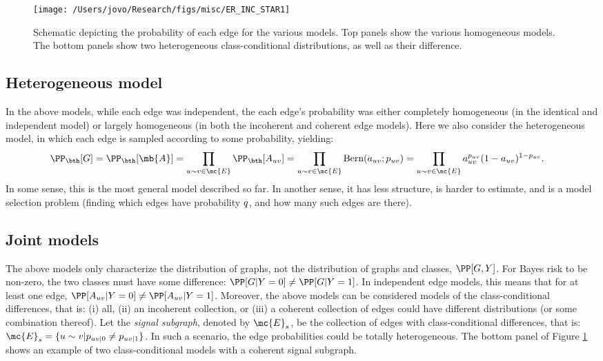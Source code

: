 \begin{figure}[h!]
\centering \texttt{[image: /Users/jovo/Research/figs/misc/ER\_INC\_STAR1]}
\caption{Schematic depicting the probability of each edge for the various models. Top panels show the various homogeneous models.  The bottom panels show two heterogeneous class-conditional distributions, as well as their difference.}
\label{fig:models}
\end{figure}


\subsection{Heterogeneous model} %
\label{sub:heterogeneous_model}

In the above models, while each edge was independent, the each edge's probability was either completely homogeneous (in the identical and independent model) or largely homogeneous (in both the incoherent and coherent edge models).  Here we also consider the heterogeneous model, in which each edge is sampled according to some probability, yielding:
\begin{align}
		\PP_{\bth}[G]&=\PP_{\bth}[\mb{A}]=\prod_{u \sim v \in \mc{E}} \PP_{\bth}[A_{uv}] %
		= \prod_{u \sim v \in \mc{E}} \text{Bern}(a_{uv}; \pp_{uv}) = \prod_{u \sim v \in \mc{E}} a_{uv}^{\pp_{uv}}(1-a_{uv})^{1-\pp_{uv}}.
\end{align}
In some sense, this is the most general model described so far.  In another sense, it has less structure,  is harder to estimate, and is a model selection problem (finding which edges have probability $q$, and how many such edges are there).



\subsection{Joint models}

The above models only characterize the distribution of graphs, not the distribution of graphs and classes, $\PP[G,Y]$.  For Bayes risk to be non-zero, the two classes must have some difference: $\PP[G | Y=0] \neq \PP[G | Y=1]$.  In  independent edge models, this means that for at least one edge, $\PP[A_{uv} | Y=0] \neq \PP[A_{uv} | Y=1]$.  Moreover, the above  models can be considered models of the class-conditional differences, that is: (i) all, (ii) an incoherent collection, or (iii) a coherent collection of edges could have different distributions (or some combination thereof).  Let the \emph{signal subgraph}, denoted by $\mc{E}_{s}$, be the collection of edges with class-conditional differences, that is: $\mc{E}_{s}=\{u \sim v | p_{uv|0} \neq p_{uv|1} \}$. In such a scenario, the edge probabilities could be totally heterogeneous.  The bottom panel of Figure \ref{fig:models} shows an example of two class-conditional models with a coherent signal subgraph.

